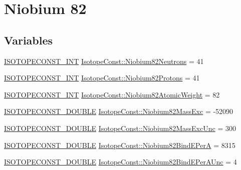 \hypertarget{group___isotope_const-_niobium-_nb82}{}\section{Niobium 82}
\label{group___isotope_const-_niobium-_nb82}
\subsection*{Variables}
\begin{DoxyCompactItemize}
\item 
\mbox{\hyperlink{group___isotope_const-_macros_ga5f18360b3e99483a35c32d789e62621c}{I\+S\+O\+T\+O\+P\+E\+C\+O\+N\+S\+T\+\_\+\+I\+NT}} \mbox{\hyperlink{group___isotope_const-_niobium-_nb82_ga42cd0cc27c420fca08c58477e9d351bc}{Isotope\+Const\+::\+Niobium82\+Neutrons}} = 41
\item 
\mbox{\hyperlink{group___isotope_const-_macros_ga5f18360b3e99483a35c32d789e62621c}{I\+S\+O\+T\+O\+P\+E\+C\+O\+N\+S\+T\+\_\+\+I\+NT}} \mbox{\hyperlink{group___isotope_const-_niobium-_nb82_ga90a2e603fb7af28aab909e3ac23261ee}{Isotope\+Const\+::\+Niobium82\+Protons}} = 41
\item 
\mbox{\hyperlink{group___isotope_const-_macros_ga5f18360b3e99483a35c32d789e62621c}{I\+S\+O\+T\+O\+P\+E\+C\+O\+N\+S\+T\+\_\+\+I\+NT}} \mbox{\hyperlink{group___isotope_const-_niobium-_nb82_ga08c48614d87fc7338eb25e33d03c3dfe}{Isotope\+Const\+::\+Niobium82\+Atomic\+Weight}} = 82
\item 
\mbox{\hyperlink{group___isotope_const-_macros_ga8f45a7272ce02c0b4c65c44636ed719a}{I\+S\+O\+T\+O\+P\+E\+C\+O\+N\+S\+T\+\_\+\+D\+O\+U\+B\+LE}} \mbox{\hyperlink{group___isotope_const-_niobium-_nb82_ga648d309edaf774e672ef95d603114877}{Isotope\+Const\+::\+Niobium82\+Mass\+Exc}} = -\/52090
\item 
\mbox{\hyperlink{group___isotope_const-_macros_ga8f45a7272ce02c0b4c65c44636ed719a}{I\+S\+O\+T\+O\+P\+E\+C\+O\+N\+S\+T\+\_\+\+D\+O\+U\+B\+LE}} \mbox{\hyperlink{group___isotope_const-_niobium-_nb82_ga0f05824c9871d005713497aa447af3e2}{Isotope\+Const\+::\+Niobium82\+Mass\+Exc\+Unc}} = 300
\item 
\mbox{\hyperlink{group___isotope_const-_macros_ga8f45a7272ce02c0b4c65c44636ed719a}{I\+S\+O\+T\+O\+P\+E\+C\+O\+N\+S\+T\+\_\+\+D\+O\+U\+B\+LE}} \mbox{\hyperlink{group___isotope_const-_niobium-_nb82_ga4ddb4d9e2d1375661ee8d25af33a4ad3}{Isotope\+Const\+::\+Niobium82\+Bind\+E\+PerA}} = 8315
\item 
\mbox{\hyperlink{group___isotope_const-_macros_ga8f45a7272ce02c0b4c65c44636ed719a}{I\+S\+O\+T\+O\+P\+E\+C\+O\+N\+S\+T\+\_\+\+D\+O\+U\+B\+LE}} \mbox{\hyperlink{group___isotope_const-_niobium-_nb82_ga9edcd6db59b355835c76b86ec036e804}{Isotope\+Const\+::\+Niobium82\+Bind\+E\+Per\+A\+Unc}} = 4

\end{DoxyCompactItemize}
